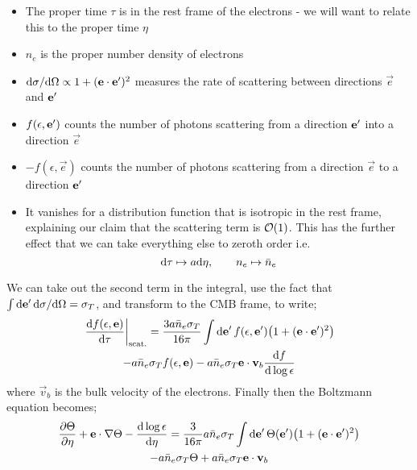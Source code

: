 \begin{itemize}
\item The proper time $\tau$ is in the rest frame of the electrons - we will want to relate this to the proper time $\eta$
\item $n_e$ is the proper number density of electrons
\item $\text{d} \sigma / \text{d} \Omega \propto 1 + (\mathbf{e}\cdot\mathbf{e}^{\prime})^2$ measures the rate of scattering between directions $\vec{e}$ and $\mathbf{e}^{\prime}$
\item $f(\epsilon, \mathbf{e}^{\prime})$ counts the number of photons scattering from a direction $\mathbf{e}^{\prime}$ into a direction $\vec{e}$
\item $-f(\epsilon, \vec{e})$ counts the number of photons scattering from a direction $\vec{e}$ to a direction $\mathbf{e}^{\prime}$
\item It vanishes for a distribution function that is isotropic in the rest frame, explaining our claim that the scattering term is $\mathcal{O}(1)$. This has the further effect that we can take everything else to zeroth order i.e.
\begin{equation*}
\text{d} \tau \mapsto a \text{d} \eta, \qquad n_e \mapsto \bar{n}_e
\end{equation*}
\end{itemize}
We can take out the second term in the integral, use the fact that $\int{\text{d}\mathbf{e}^{\prime}\,\text{d}\sigma/\text{d}\Omega} = \sigma_T$, and transform to the CMB frame, to write;
\begin{multline*}
\left.\frac{\ud f(\epsilon, \vec{e})}{\ud \tau}\right|_{\text{scat.}} = \frac{3a\bar{n}_e \sigma_T}{16\pi}\int{\upd{\vec{e}\pr} f(\epsilon, \vec{e}\pr)\left(1 + (\vec{e}\cdot\vec{e}\pr)^2\right)} \\ -a\bar{n}_e \sigma_T f(\epsilon, \vec{e}) -a\bar{n}_e \sigma_T \vec{e}\cdot\vec{v}_b \frac{\ud f}{\ud \log \epsilon}
\end{multline*}
where $\vec{v}_b$ is the bulk velocity of the electrons. Finally then the Boltzmann equation becomes;
\begin{multline}
\frac{\del \Theta}{\del \eta} + \vec{e}\cdot\nabla\Theta - \frac{\ud \log \epsilon}{\ud \eta} = \frac{3}{16\pi}a\bar{n}_e\sigma_T \int{\upd{\vec{e}\pr}\Theta(\vec{e}\pr)\left(1 + (\vec{e}\cdot\vec{e}\pr)^2\right)} \\ -a\bar{n}_e \sigma_T \Theta + a\bar{n}_e \sigma_T \vec{e}\cdot\vec{v}_b
\end{multline}

